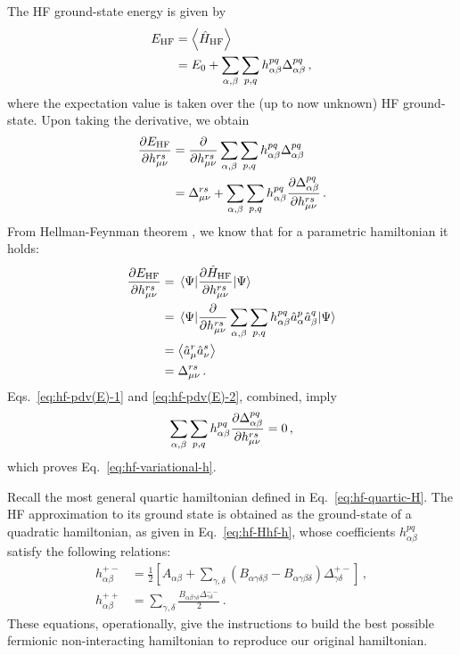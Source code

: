 \begin{tabproof}
	
	The HF ground-state energy is given by
	\[
	\begin{aligned}
		E_\mathrm{HF} &= \ev{\hat H_\mathrm{HF}} \\
		&= E_0 + \sum_{\alpha,\beta} \sum_{p,q} h_{\alpha\beta}^{pq} \Delta_{\alpha\beta}^{pq} \, ,
	\end{aligned}
	\]
	where the expectation value is taken over the (up to now unknown) HF ground-state. Upon taking the derivative, we obtain
	\begin{align}
		\pdv{E_\mathrm{HF}}{h_{\mu\nu}^{rs}} &= \pdv{}{h_{\mu\nu}^{rs}} \sum_{\alpha,\beta} \sum_{p,q} h_{\alpha\beta}^{pq} \Delta_{\alpha\beta}^{pq} \nonumber \\
		&= \Delta_{\mu\nu}^{rs} + \sum_{\alpha,\beta} \sum_{p,q} h_{\alpha\beta}^{pq} \pdv{\Delta_{\alpha\beta}^{pq}}{h_{\mu\nu}^{rs}} \, . \label{eq:hf-pdv(E)-1}
	\end{align}
	From Hellman-Feynman theorem \cite{grosso2014solid}, we know that for a parametric hamiltonian it holds:
	\begin{align}
		\pdv{E_\mathrm{HF}}{h_{\mu\nu}^{rs}} &= \mel{\Psi}{\pdv{\hat H_\mathrm{HF}}{h_{\mu\nu}^{rs}}}{\Psi} \nonumber \\
		&= \mel{\Psi}{\pdv{}{h_{\mu\nu}^{rs}}\sum_{\alpha,\beta} \sum_{p,q} h_{\alpha\beta}^{pq} \hat a_\alpha^p \hat a_\beta^q}{\Psi} \nonumber \\
		&= \big\langle \hat a_\mu^r \hat a_\nu^s \big\rangle \nonumber \\
		&= \Delta_{\mu\nu}^{rs} \, . \label{eq:hf-pdv(E)-2}
	\end{align}
	Eqs.~\eqref{eq:hf-pdv(E)-1} and \eqref{eq:hf-pdv(E)-2}, combined, imply
	\[
		\sum_{\alpha,\beta} \sum_{p,q} h_{\alpha\beta}^{pq} \pdv{\Delta_{\alpha\beta}^{pq}}{h_{\mu\nu}^{rs}} = 0 \, , 
	\]
	which proves Eq.~\eqref{eq:hf-variational-h}.
\end{tabproof}

Recall the most general quartic hamiltonian defined in Eq.~\eqref{eq:hf-quartic-H}. The HF approximation to its ground state is obtained as the ground-state of a quadratic hamiltonian, as given in Eq.~\eqref{eq:hf-Hhf-h}, whose coefficients $h_{\alpha\beta}^{pq}$ satisfy the following relations:
\begin{align}
	h_{\alpha\beta}^{+-} &= \frac{1}{2} \left[
	A_{\alpha\beta} + \sum_{\gamma,\delta}
	\left(
	B_{\alpha\gamma\delta\beta} - B_{\alpha\gamma\beta\delta}
	\right) \Delta_{\gamma\delta}^{+-} 
	\right] \label{eq:hf-solution-h+-} \, , \\
	h_{\alpha\beta}^{++} &= \sum_{\gamma,\delta} \frac{B_{\alpha\beta\gamma\delta} \Delta_{\gamma\delta}^{--}}{2} \label{eq:hf-solution-h++} \, .
\end{align}
These equations, operationally, give the instructions to build the best possible fermionic non-interacting hamiltonian to reproduce our original hamiltonian.

